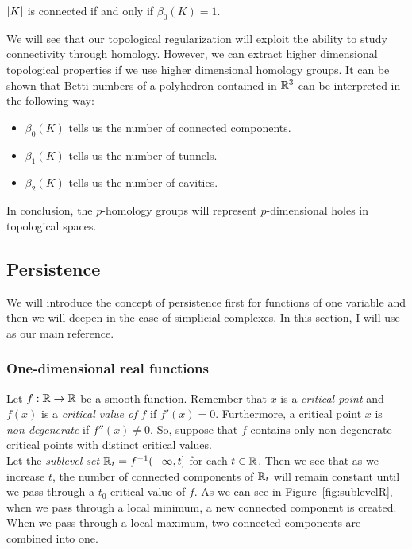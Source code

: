 \documentclass[../main.tex]{subfiles}
\begin{document}
\begin{corollary}
$\left\lvert K \right\rvert$ is connected if and only if $\beta_0(K)=1$.
\end{corollary}

We will see that our topological regularization will exploit the ability to study connectivity through homology. However, we can extract higher dimensional topological properties if we use higher dimensional homology groups. It can be shown \cite[Chapter~5]{edelsbrunner_computational_2010} that Betti numbers of a polyhedron contained in $\mathbb{R}^3$ can be interpreted in the following way:
\begin{itemize}
\item $\beta_0(K)$ tells us the number of connected components.
\item $\beta_1(K)$ tells us the number of tunnels.
\item $\beta_2(K)$ tells us the number of cavities.
\end{itemize}

In conclusion, the $p$-homology groups will represent $p$-dimensional holes in topological spaces.

\subsection{Persistence}
We will introduce the concept of persistence first for functions of one variable and then we will deepen in the case of simplicial complexes. In this section, I will use \cite{goodman_persistent_2008} as our main reference.

\subsubsection*{One-dimensional real functions}
Let $f: \mathbb{R} \to \mathbb{R}$ be a smooth function. Remember that $x$ is a \emph{critical point} and $f(x)$ is a \emph{critical value of $f$} if $f'(x)=0$. Furthermore, a critical point $x$ is \emph{non-degenerate} if $f''(x) \neq 0$. So, suppose that $f$ contains only non-degenerate critical points with distinct critical values.\\

Let the \emph{sublevel set} $\mathbb{R}_t=f^{-1}(-\infty, t]$ for each $t \in \mathbb{R}$. Then we see that as we increase $t$, the number of connected components of $\mathbb{R}_t$ will remain constant until we pass through a $t_0$ critical value of $f$.  As we can see in Figure~\ref{fig:sublevelR}, when we pass through a local minimum, a new connected component is created. When we pass through a local maximum, two connected components are combined into one.\\
\end{document}

